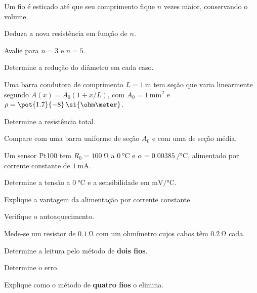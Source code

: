 \begin{questao}[3]{}

Um fio é esticado até que seu comprimento fique $n$ vezes maior, conservando o
volume.
\begin{itensq}
\item Deduza a nova resistência em função de $n$.
\item Avalie para $n=3$ e $n=5$.
\item Determine a redução do diâmetro em cada caso.
\end{itensq}


\end{questao}
\begin{questao}[3]{}

Uma barra condutora de comprimento $L=\SI{1}{\meter}$ tem seção que varia
linearmente segundo $A(x)=A_0\left(1+x/L\right)$, com
$A_0=\SI{1}{\milli\meter\squared}$ e $\rho=\pot{1.7}{-8}\,\si{\ohm\meter}$.
\begin{itensq}
\item Determine a resistência total.
\item Compare com uma barra uniforme de seção $A_0$ e com uma de seção média.
\end{itensq}


\end{questao}
\begin{questao}[3]{}

Um sensor Pt100 tem $R_0=\SI{100}{\ohm}$ a $\SI{0}{\celsius}$ e
$\alpha=\SI{0.00385}{\per\celsius}$, alimentado por corrente constante de
$\SI{1}{\milli\ampere}$.
\begin{itensq}
\item Determine a tensão a $\SI{0}{\celsius}$ e a sensibilidade em
      $\si{\milli\volt\per\celsius}$.
\item Explique a vantagem da alimentação por corrente constante.
\item Verifique o autoaquecimento.
\end{itensq}


\end{questao}
\begin{questao}[3]{}

Mede-se um resistor de $\SI{0.1}{\ohm}$ com um ohmímetro cujos cabos têm
$\SI{0.2}{\ohm}$ cada.
\begin{itensq}
\item Determine a leitura pelo método de \textbf{dois fios}.
\item Determine o erro.
\item Explique como o método de \textbf{quatro fios} o elimina.
\end{itensq}


\end{questao}
